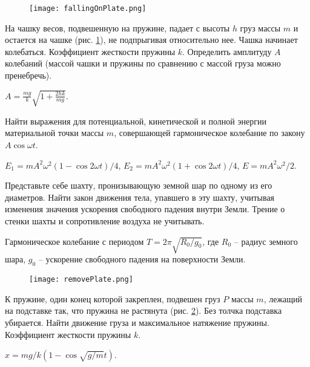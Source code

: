 \begin{figure}[h]
\centering
\texttt{[image: fallingOnPlate.png]}
\caption{}
\label{fallingOnPlate}
\end{figure}

\begin{ex} %
На чашку весов, подвешенную на пружине, падает с высоты $h$ груз массы $m$ и остается на чашке (рис. \ref{fallingOnPlate}), не подпрыгивая относительно нее. Чашка начинает колебаться. Коэффициент жесткости пружины $k$. Определить амплитуду $A$ колебаний (массой чашки и пружины по сравнению с массой груза можно пренебречь).
\begin{ans}
$A = \frac{mg}{k}\sqrt{ 1 + \frac{2hk}{mg}}$.
\end{ans}
\end{ex}	

\begin{ex} %
Найти выражения для потенциальной, кинетической и полной энергии материальной точки массы $m$, совершающей гармоническое колебание по закону $A \cos \omega t$.
\begin{ans}
$E_1 = m A^2 \omega^2 (1 - \cos 2 \omega t)/4$, $E_2 = m A^2 \omega^2 (1 + \cos 2 \omega t)/4$, $E = m A^2 \omega^2 /2$.
\end{ans}
\end{ex}	

\begin{ex} %
Представьте себе шахту, пронизывающую земной шар по одному из его диаметров. Найти закон движения тела, упавшего в эту шахту, учитывая изменения значения ускорения свободного падения внутри Земли. Трение о стенки шахты и сопротивление воздуха не учитывать.
\begin{ans}
Гармоническое колебание с периодом $T = 2 \pi \sqrt{R_0 / g_0}$, где $R_0$ -- радиус земного шара, $g_0$ -- ускорение свободного падения на поверхности Земли.
\end{ans}
\end{ex}	

\begin{figure}[h]
\centering
\texttt{[image: removePlate.png]}
\caption{}
\label{removePlate}
\end{figure}

\begin{ex} %
К пружине, один конец которой закреплен, подвешен груз $P$ массы $m$, лежащий на подставке так, что пружина не растянута (рис. \ref{removePlate}). Без толчка подставка убирается. Найти движение груза и максимальное натяжение пружины. Коэффициент жесткости пружины $k$.
\begin{ans}
$x = mg/k(1-\cos \sqrt{g/m} t)$.
\end{ans}
\end{ex}	


